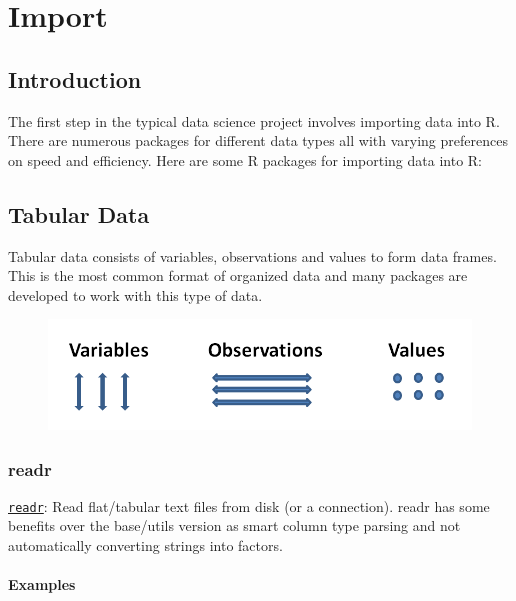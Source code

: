 \documentclass[]{book}
\begin{document}
\chapter{Import}\label{import}

\section{\texorpdfstring{\textbf{Introduction}}{Introduction}}\label{introduction-1}

The first step in the typical data science project involves importing
data into R. There are numerous packages for different data types all
with varying preferences on speed and efficiency. Here are some R
packages for importing data into R:

\section{\texorpdfstring{\textbf{Tabular
Data}}{Tabular Data}}\label{tabular-data}

Tabular data consists of variables, observations and values to form data
frames. This is the most common format of organized data and many
packages are developed to work with this type of data.

\begin{figure}[htbp]
\centering
\includegraphics{01_var_obs_val.PNG}
\caption{}
\end{figure}

\subsection{\texorpdfstring{\textbf{readr }}{readr }}\label{readr}

\href{https://CRAN.R-project.org/package=readr}{\texttt{readr}}: Read
flat/tabular text files from disk (or a connection). readr has some
benefits over the base/utils version as smart column type parsing and
not automatically converting strings into factors.

\subsubsection{\texorpdfstring{\textbf{Examples
}}{Examples }}\label{examples}
\end{document}
